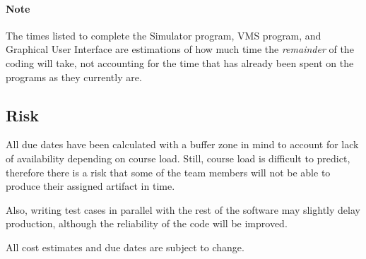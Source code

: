 \documentclass{article}
\begin{document}
\paragraph{Note}
The times listed to complete the Simulator program, VMS program, and Graphical User Interface are estimations of how much time the \emph{remainder} of the coding will take, not accounting for the time that has already been spent on the programs as they currently are.

\subsection{Risk}

	All due dates have been calculated with a buffer zone in mind to account for lack of availability depending on course load. Still, course load is difficult to predict, therefore there is a risk that some of the team members will not be able to produce their assigned artifact in time.

Also, writing test cases in parallel with the rest of the software may slightly delay production, although the reliability of the code will be improved.

All cost estimates and due dates are subject to change.

\break
\listoffigures
\end{document}
